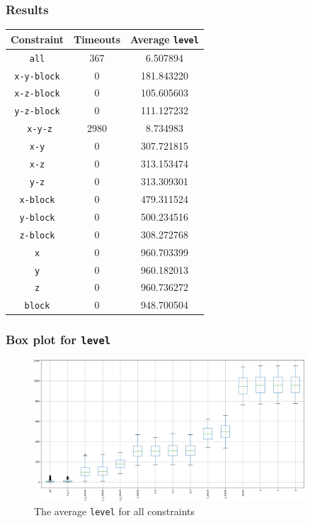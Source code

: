 \documentclass{beamer}
\begin{document}
\begin{frame}
\frametitle{Results}
	{\small 
	\begin{table}[h]
	\begin{center}
	\setlength{\tabcolsep}{5pt}
	\begin{tabular}{| c | c | c |}
	\hline
	Constraint  & Timeouts & Average \texttt{level} \\ \hline
	\texttt{all}  & 367 &  6.507894  \\ \hline
	\texttt{x-y-block}   & 0  &  181.843220\\ \hline
	\texttt{x-z-block}  & 0 &  105.605603 \\ \hline
	\texttt{y-z-block}  & 0 &  111.127232\\ \hline
	\texttt{ x-y-z}  & 2980 &  8.734983\\ \hline
	\texttt{x-y}  & 0 &  307.721815\\ \hline
	\texttt{x-z} & 0 &  313.153474 \\ \hline
	\texttt{y-z} & 0 &  313.309301 \\ \hline
	\texttt{x-block} & 0 &  479.311524 \\ \hline
	\texttt{y-block}  & 0 &  500.234516 \\ \hline
	\texttt{z-block} & 0  &  308.272768 \\ \hline
	\texttt{x}   & 0 &  960.703399 \\ \hline
	\texttt{y}  & 0 &  960.182013 \\ \hline
	\texttt{z}   & 0 &  960.736272 \\ \hline
	\texttt{block}  & 0 &  948.700504\\ \hline
	\end{tabular}	
	\end{center}
	\end{table}
	}
\end{frame}

\begin{frame}
\frametitle{Box plot for \texttt{level}}
\begin{figure}
\includegraphics[width=0.9\textwidth]{level_box_plot}
\caption*{The average \texttt{level} for all constraints}
\end{figure}
\end{frame}
\end{document}
